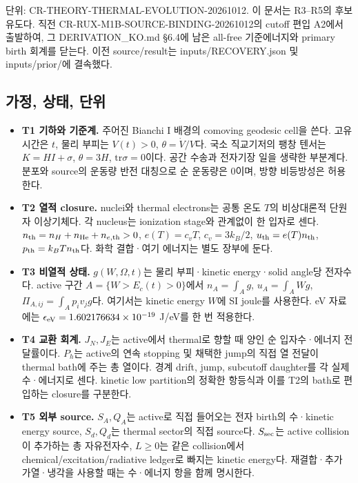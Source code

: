 단위: CR-THEORY-THERMAL-EVOLUTION-20261012. 이 문서는 R3--R5의 후보 유도다. 직전 CR-RUX-M1B-SOURCE-BINDING-20261012의 cutoff 편입 A2에서 출발하여, 그 DERIVATION\_KO.md §6.4에 남은 all-free 기준에너지와 primary birth 회계를 닫는다. 이전 source/result는 inputs/RECOVERY.json 및 inputs/prior/에 결속했다.

\hypertarget{uxac00uxc815-uxc0c1uxd0dc-uxb2e8uxc704}{%
\subsection{가정, 상태, 단위}\label{uxac00uxc815-uxc0c1uxd0dc-uxb2e8uxc704}}

\begin{itemize}
\tightlist
\item
  \textbf{T1 기하와 기준계.} 주어진 Bianchi I 배경의 comoving geodesic cell을 쓴다. 고유시간은 \(t\), 물리 부피는 \(V(t)>0\), \(\theta=\dot V/V\)다. 국소 직교기저의 팽창 텐서는 \(K=H I+\sigma\), \(\theta=3H\), \(\mathrm{tr}\sigma=0\)이다. 공간 수송과 전자기장 일을 생략한 부분계다. 분포와 source의 운동량 반전 대칭으로 순 운동량은 0이며, 방향 비등방성은 허용한다.
\item
  \textbf{T2 열적 closure.} nuclei와 thermal electrons는 공통 온도 \(T\)의 비상대론적 단원자 이상기체다. 각 nucleus는 ionization stage와 관계없이 한 입자로 센다. \(n_{\rm th}=n_H+n_{\rm He}+n_{e,\rm th}>0\), \(e(T)=c_vT\), \(c_v=3k_B/2\), \(u_{\rm th}=e(T)n_{\rm th}\), \(p_{\rm th}=k_BTn_{\rm th}\)다. 화학 결합·여기 에너지는 별도 장부에 둔다.
\item
  \textbf{T3 비열적 상태.} \(g(W,\Omega,t)\)는 물리 부피·kinetic energy·solid angle당 전자수다. active 구간 \(A=\{W>E_c(t)>0\}\)에서 \(n_A=\int_Ag\), \(u_A=\int_AWg\), \(\Pi_{A,ij}=\int_Ap_iv_jg\)다. 여기서는 kinetic energy \(W\)에 SI joule를 사용한다. eV 자료에는 \(\epsilon_{\rm eV}=1.602176634\times10^{-19}\) J/eV를 한 번 적용한다.
\item
  \textbf{T4 교환 회계.} \(J_N,J_E\)는 active에서 thermal로 향할 때 양인 순 입자수·에너지 전달률이다. \(P_h\)는 active의 연속 stopping 및 채택한 jump의 직접 열 전달이 thermal bath에 주는 총 열이다. 경계 drift, jump, subcutoff daughter를 각 실제 수·에너지로 센다. kinetic low partition의 정확한 항등식과 이를 T2의 bath로 편입하는 closure를 구분한다.
\item
  \textbf{T5 외부 source.} \(S_A,Q_A\)는 active로 직접 들어오는 전자 birth의 수·kinetic energy source, \(S_d,Q_d\)는 thermal sector의 직접 source다. \(S_{\rm sec}\)는 active collision이 추가하는 총 자유전자수, \(L\ge0\)는 같은 collision에서 chemical/excitation/radiative ledger로 빠지는 kinetic energy다. 재결합·추가 가열·냉각을 사용할 때는 수·에너지 항을 함께 명시한다.
\end{itemize}

